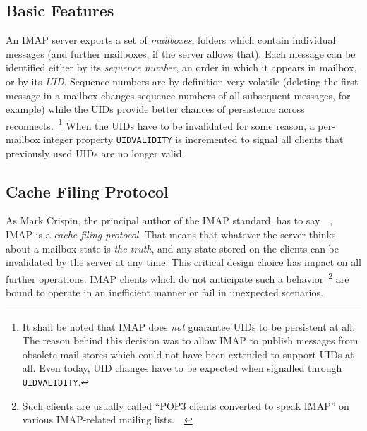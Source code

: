 \documentclass[trojita]{subfiles}
\begin{document}
\subsection{Basic Features}

An IMAP server exports a set of {\em mailboxes}, folders which contain individual messages (and further mailboxes, if
the server allows that).  Each message can be identified either by its {\em sequence number}, an order in which it
appears in mailbox, or by its {\em UID}.  Sequence numbers are by definition very volatile (deleting the first message
in a mailbox changes sequence numbers of all subsequent messages, for example) while the UIDs provide better chances of
persistence across reconnects.~\footnote{It shall be noted that IMAP does {\em not} guarantee UIDs to be persistent at
all.  The reason behind this decision was to allow IMAP to publish messages from obsolete mail stores which could not
have been extended to support UIDs at all.  Even today, UID changes have to be expected when signalled through {\tt
UIDVALIDITY}.} When the UIDs have to be invalidated for some reason, a per-mailbox integer property {\tt UIDVALIDITY}
is incremented to signal all clients that previously used UIDs are no longer valid.

\subsection{Cache Filing Protocol}

As Mark Crispin, the principal author of the IMAP standard, has to
say~\cite{crispin-imap-cache-filing-1}~\cite{crispin-imap-cache-filing-2}, IMAP is a {\em cache filing protocol}.  That
means that whatever the server thinks about a mailbox state is {\em the truth}, and any state stored on the clients can
be invalidated by the server at any time.  This critical design choice has impact on all further operations.  IMAP
clients which do not anticipate such a behavior~\footnote{Such clients are usually called ``POP3 clients converted to
speak IMAP'' on various IMAP-related mailing
lists.~\cite{shannon-imap-clients-glorified-pop}~\cite{crispin-imap-clients-glorified-pop}} are bound to operate in an
inefficient manner or fail in unexpected scenarios.
\end{document}
